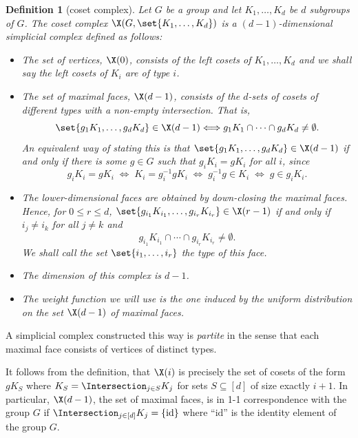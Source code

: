 \documentclass[11pt]{article}
\newtheorem{definition}[theorem]{Definition}
\begin{document}
\begin{definition}[coset complex] Let $G$ be a group and let
  $K_1,\ldots, K_d$ be $d$ subgroups of $G$. The
coset complex $\X(G,\set{K_1,\ldots, K_d})$ is a $(d-1)$-dimensional
simplicial complex defined as follows:
\begin{itemize}
\item The set of \emph{vertices}, $\X(0)$, 
consists of
the %
%
%
left cosets of $K_1,\ldots, K_d$ and we shall say
the %
left  %
cosets of $K_i$ are of \emph{type} $i$.
\item The set of \emph{maximal faces}, $\X({d-1})$,
consists of the $d$-sets of
cosets of different types with a non-empty intersection. That is,
  \[
    \set{g_1 K_1,\ldots, g_d K_d}\in \X(d-1) \Longleftrightarrow g_1 K_1 \cap \cdots \cap g_d K_d \neq \emptyset.
  \]
  An equivalent way of stating this is that $\set{g_1 K_1,\ldots, g_d K_d}\in \X(d-1)$ if and only if there is some $g \in G$ such that $g_i K_i = g K_i$ for all $i$, since
  \[
    g_i K_i = g K_i \;\Longleftrightarrow\; K_i = g_i^{-1} g K_i  \;\Longleftrightarrow\; g_{i}^{-1} g \in K_i \;\Longleftrightarrow\; g \in g_{i} K_i.
  \]
\item The 
lower-dimensional %
faces are obtained by \emph{down-closing}
  the maximal faces. Hence, for $0\leq r \leq d$, $\set{g_{i_1} K_{i_1}, \ldots, g_{i_r} K_{i_r}} \in \X(r-1)$ if and only if $i_j \neq i_k$ for all $j \neq k$ and
  \[
    g_{i_1} K_{i_1} \cap \cdots \cap g_{i_r} K_{i_r} \neq \emptyset.
  \]
  We shall call the set $\set{i_1,\ldots, i_r}$ the \emph{type} of this face.
\item The dimension of this complex is $d-1$.
\item The weight function we will use is the one induced by the
  uniform distribution on the set $\X(d-1)$ of maximal faces. 
  \qedhere
\end{itemize}
\end{definition}

A simplicial complex constructed this way is \emph{partite} in the sense that each maximal face consists of vertices of distinct types. 

It follows from the definition, that $\X(i)$ is precisely the set of
cosets of the form $g K_S$ where $K_S = \Intersection_{j\in S} K_j$
for sets $S \subseteq [d]$ of size exactly $i+1$. In particular, $\X(d-1)$, the
set of maximal faces, is in 1-1 correspondence with the group
$G$ if $\Intersection_{j\in [d]} K_j = \{\mathrm{id}\}$ where
``$\mathrm{id}$'' is the identity element of the group $G$. 
\end{document}
